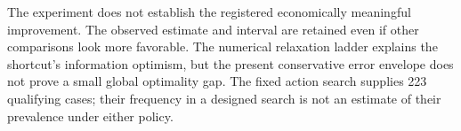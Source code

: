 The experiment does not establish the registered economically meaningful improvement. The observed estimate and interval are retained even if other comparisons look more favorable. The numerical relaxation ladder explains the shortcut's information optimism, but the present conservative error envelope does not prove a small global optimality gap. The fixed action search supplies 223 qualifying cases; their frequency in a designed search is not an estimate of their prevalence under either policy.
